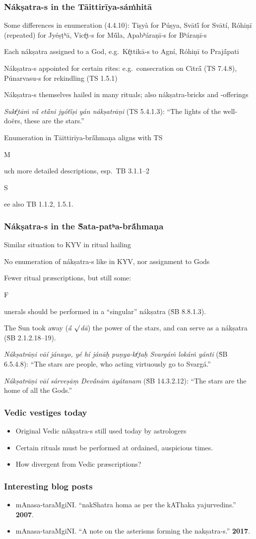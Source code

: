 \documentclass[pdf]{beamer}
\newcommand{\Subitem}[1]{{\setlength\itemindent{12pt} \item[-] #1}}
\begin{document}
\begin{frame} \frametitle{Nákṣatra-s in the Tāittirīya-sáṁhitā}
\begin{itemize}
	\item Some differences in enumeration (4.4.10): Tiṣyà for Púṣya, Svātī́ for Svātí, Róhiṇī (repeated) for Jyéṣṭʰā, Vicŕ̥t-s for Mū́la, Apabʰáraṇī-s for Bʰáraṇī-s
	\item Each nákṣatra assigned to a God, e.g.~Kŕ̥ttikā-s to Agní, Róhiṇī to Prajā́pati
	\item Nákṣatra-s appointed for certain rites: e.g.~consecration on Citrā́ (TS 7.4.8), Púnarvasu-s for rekindling (TS 1.5.1)
	\item Nákṣatra-s themselves hailed in many rituals; also nákṣatra-bricks and -offerings
	\item \textit{Sukŕ̥tāṁ vā́ etā́ni jyótī̃ṣi yán nákṣatrāṇi} (TS 5.4.1.3): ``The lights of the well-doërs, these are the stars.''
	\item Enumeration in Tāittirīya-brā́hmaṇa aligns with TS
	\Subitem Much more detailed descriptions, esp.~TB 3.1.1–2
	\Subitem See also TB 1.1.2, 1.5.1.
\end{itemize}
\end{frame}

\begin{frame} \frametitle{Nákṣatra-s in the Ṡata-patʰa-brā́hmaṇa}
\begin{itemize}
	\item Similar situation to KYV in ritual hailing
	\item No enumeration of nákṣatra-s like in KYV, nor assignment to Gods
	\item Fewer ritual præscriptions, but still some:
	\Subitem Funerals should be performed in a ``singular'' nákṣatra (ṠB 8.8.1.3).
	\item The Sun took away (\textit{ā́ $\surd$dā}) the power of the stars, and can serve as a nákṣatra (ṠB 2.1.2.18–19).
	\item \textit{Nákṣatrāṇi vāí jánayo, yé hí jánāḥ puṇya-kŕ̥taḥ Svargáṁ lokáṁ yánti} (ṠB 6.5.4.8): ``The stars are people, who acting virtuously go to Svargá.''
	\item \textit{Nákṣatrāṇi vāí sárveṣāṃ Devā́nām āyátanam} (ṠB 14.3.2.12): ``The stars are the home of all the Gods.''
\end{itemize}
\end{frame}

\begin{frame} \frametitle{Vedic vestiges today}
\begin{itemize}
	\item Original Vedic nákṣatra-s still used today by astrologers
	\item Certain rituals must be performed at ordained, auspicious times.
	\item How divergent from Vedic præscriptions?
\end{itemize}
\end{frame}

\begin{frame} \frametitle{Interesting blog posts}
\begin{itemize}
	\item mAnasa-taraMgiNI. ``nakShatra homa as per the kAThaka yajurvedins.'' \textbf{2007}.
	\item mAnasa-taraMgiNI. ``A note on the asterisms forming the nakṣatra-s.'' \textbf{2017}.
\end{itemize}
\end{frame}

\end{document}
